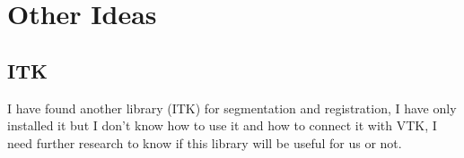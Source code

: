 \documentclass[10pt, b5paper]{article}
\begin{document}
\section{Other Ideas}
\subsection{ITK}
I have found another library (ITK) for segmentation and registration, I have only installed it but I don't know how to use it and how to connect it with VTK, I need further research to know if this library will be useful for us or not.

 



    
   
    
\end{document}
